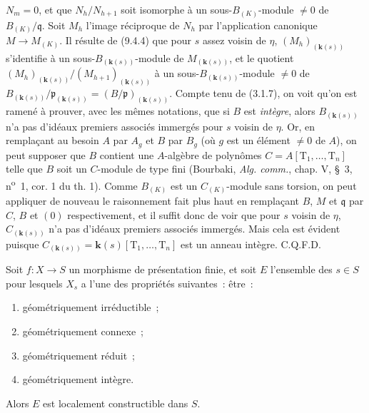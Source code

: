 $N_m=0$, et que $N_h/N_{h+1}$ soit isomorphe à un sous-$B_{(K)}$-module
$\neq0$ de $B_{(K)}/\mathfrak q$. Soit $M_h$ l'image réciproque de $N_h$ par
l'application canonique $M\to M_{(K)}$. Il résulte de (9.4.4) que pour $s$
assez voisin de $\eta$, $(M_h)_{(\mathbf{k}(s))}$ s'identifie à un
sous-$B_{(\mathbf{k}(s))}$-module de $M_{(\mathbf{k}(s))}$, et le
quotient
$(M_h)_{(\mathbf{k}(s))}/(M_{h+1})_{(\mathbf{k}(s))}$ à un
sous-$B_{(\mathbf{k}(s))}$-module $\neq0$ de
$B_{(\mathbf{k}(s))}/\mathfrak p_{(\mathbf{k}(s))}
=(B/\mathfrak p)_{(\mathbf{k}(s))}$. Compte tenu de (3.1.7), on voit qu'on
est ramené à prouver, avec les mêmes notations, que si $B$ est \emph{intègre},
alors $B_{(\mathbf{k}(s))}$ n'a pas d'idéaux premiers associés immergés
pour $s$ voisin de $\eta$. Or, en remplaçant au besoin $A$ par $A_g$ et $B$ par
$B_g$ (où $g$ est un élément $\neq0$ de $A$), on peut supposer que $B$ contient
une $A$-algèbre de polynômes $C=A[\mathrm T_1,\ldots,\mathrm T_n]$ telle que
$B$ soit un $C$-module de type fini (Bourbaki, \emph{Alg. comm.}, chap. V,
\S~3, n\textsuperscript{o}~1, cor. 1 du th. 1). Comme $B_{(K)}$ est un $C_{(K)}$-module
sans torsion, on peut appliquer de nouveau le raisonnement fait plus haut en
remplaçant $B$, $M$ et $\mathfrak q$ par $C$, $B$ et $(0)$ respectivement, et
il suffit donc de voir que pour $s$ voisin de $\eta$, $C_{(\mathbf{k}(s))}$
n'a pas d'idéaux premiers associés immergés. Mais cela est évident puisque
$C_{(\mathbf{k}(s))}=\boldsymbol{k}(s)[\mathrm T_1,\ldots,\mathrm T_n]$
est un anneau intègre. C.Q.F.D.

\begin{theorem}[9.7.7]
\label{IV.9.7.7-fr}
Soit $f:X\to S$ un morphisme de présentation finie, et soit $E$ l'ensemble des
$s\in S$ pour lesquels $X_s$ a l'une des propriétés suivantes~: être~:
\begin{enumerate}[label=\textup{(\roman*)}]
  \item géométriquement irréductible~;
  \item géométriquement connexe~;
  \item géométriquement réduit~;
  \item géométriquement intègre.
\end{enumerate}
Alors $E$ est localement constructible dans $S$.
\end{theorem}

